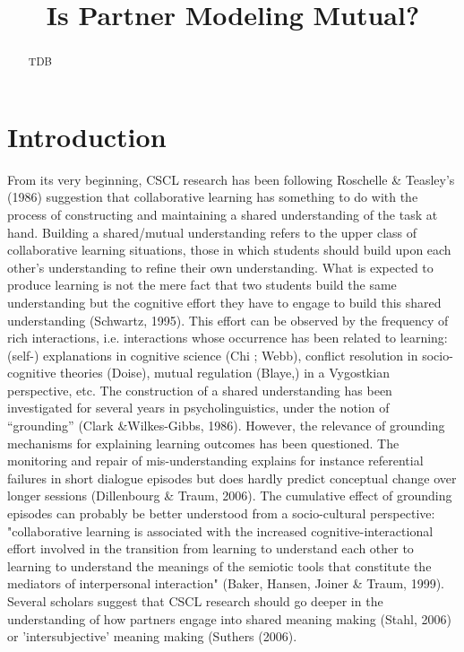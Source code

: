 \documentclass[twocolumn]{article}
\title{Is Partner Modeling Mutual?}
\begin{document}
\maketitle

\begin{abstract}
    TDB
\end{abstract}

\section{Introduction}


From its very beginning, CSCL research has been following Roschelle \& Teasley's
(1986) suggestion that collaborative learning has something to do with the
process of constructing and maintaining a shared understanding of the task at
hand. Building a shared/mutual understanding refers to the upper class of
collaborative learning situations, those in which students should build upon
each other's understanding to refine their own understanding. What is expected
to produce learning is not the mere fact that two students build the same
understanding but the cognitive effort they have to engage to build this shared
understanding (Schwartz, 1995). This effort can be observed by the frequency of
rich interactions, i.e. interactions whose occurrence has been related to
learning: (self-) explanations in cognitive science (Chi ; Webb), conflict
resolution in socio-cognitive theories (Doise), mutual regulation (Blaye,) in a
Vygostkian perspective, etc. The construction of a shared understanding has been
investigated for several years in psycholinguistics, under the  notion of
“grounding” (Clark \&Wilkes-Gibbs, 1986). However, the relevance of grounding
mechanisms for explaining learning outcomes has been questioned. The monitoring
and repair of mis-understanding explains for instance referential failures in
short dialogue episodes but does hardly predict conceptual change over longer
sessions (Dillenbourg \& Traum, 2006). The cumulative effect of grounding
episodes can probably be better understood from a socio-cultural perspective:
"collaborative learning is associated with the increased cognitive-interactional
effort involved in the transition from learning to understand each other to
learning to understand the meanings of the semiotic tools that constitute the
mediators of interpersonal interaction" (Baker, Hansen, Joiner \& Traum, 1999).
Several scholars suggest that CSCL research should go deeper in the
understanding of how partners engage into shared meaning making (Stahl, 2006) or
'intersubjective' meaning making (Suthers (2006).  
\end{document}
